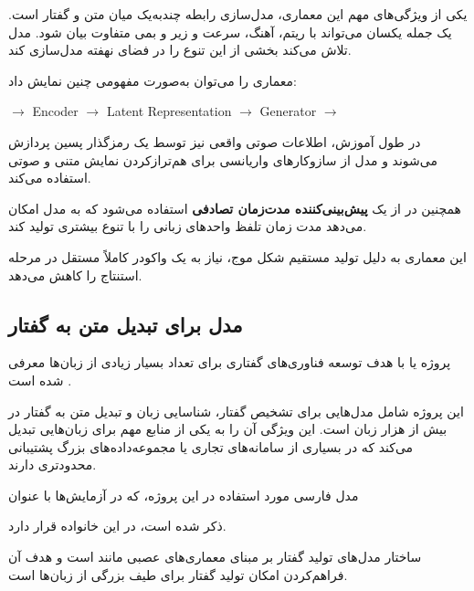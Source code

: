 یکی از ویژگی‌های مهم این معماری، مدل‌سازی رابطه چندبه‌یک میان
متن و گفتار است.
یک جمله یکسان می‌تواند با ریتم، آهنگ، سرعت و زیر و بمی متفاوت
بیان شود.
مدل  تلاش می‌کند بخشی از این تنوع را در فضای نهفته
مدل‌سازی کند.

معماری را می‌توان به‌صورت مفهومی چنین نمایش داد:

\begin{center}
$\longrightarrow$
 Encoder
$\longrightarrow$
Latent Representation
$\longrightarrow$
Generator
$\longrightarrow$
\end{center}

در طول آموزش، اطلاعات صوتی واقعی نیز توسط یک رمزگذار پسین
پردازش می‌شوند و مدل از سازوکارهای واریانسی برای هم‌ترازکردن
نمایش متنی و صوتی استفاده می‌کند.

همچنین در  از یک
\textbf{پیش‌بینی‌کننده مدت‌زمان تصادفی}
استفاده می‌شود که به مدل امکان می‌دهد مدت زمان تلفظ واحدهای
زبانی را با تنوع بیشتری تولید کند.

این معماری به دلیل تولید مستقیم شکل موج، نیاز به یک واکودر
کاملاً مستقل در مرحله استنتاج را کاهش می‌دهد.


\subsection{مدل  برای تبدیل متن به گفتار}

پروژه
یا
با هدف توسعه فناوری‌های گفتاری برای تعداد بسیار زیادی از
زبان‌ها معرفی شده است \cite{pratap2023mms}.

این پروژه شامل مدل‌هایی برای تشخیص گفتار، شناسایی زبان و
تبدیل متن به گفتار در بیش از هزار زبان است.
این ویژگی آن را به یکی از منابع مهم برای زبان‌هایی تبدیل می‌کند
که در بسیاری از سامانه‌های تجاری یا مجموعه‌داده‌های بزرگ
پشتیبانی محدودتری دارند.

مدل فارسی مورد استفاده در این پروژه، که در آزمایش‌ها با عنوان

\begin{center}
\end{center}

ذکر شده است، در این خانواده قرار دارد.

ساختار مدل‌های تولید گفتار  بر مبنای معماری‌های عصبی
مانند  است و هدف آن فراهم‌کردن امکان تولید گفتار
برای طیف بزرگی از زبان‌ها است.

